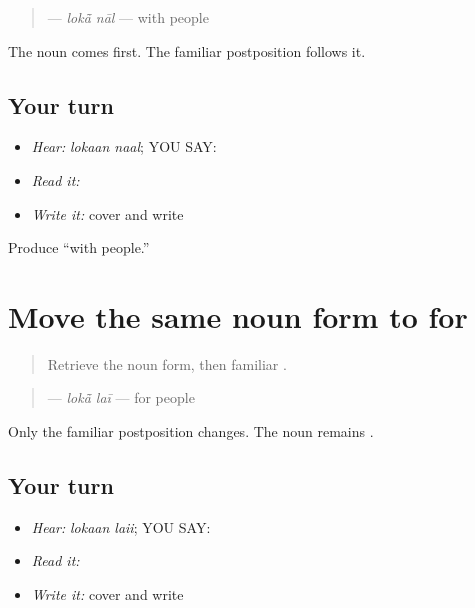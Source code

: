 \begin{grammarlens}[title={Grammar Lens: one familiar postposition}]
\begin{quote}
\textbf{ } — \emph{lokā̃ nāl} — with people
\end{quote}

The noun comes first. The familiar postposition follows it.
\end{grammarlens}

\subsection*{Your turn}
\begin{itemize}
\raggedright
  \item \emph{Hear:} \emph{lokaan naal}; YOU SAY: \textbf{ }
  \item \emph{Read it:} \textbf{ }
  \item \emph{Write it:} cover and write \textbf{ }
\end{itemize}

\begin{tcolorbox}[breakable,colback=teal!4,colframe=teal!35!black,title={Before you move on}]
Produce “with people.”
\end{tcolorbox}
\section[\texorpdfstring{\pa{ਲੋਕਾਂ} \pa{ਲਈ} (lokaan laii)}{ਲੋਕਾਂ ਲਈ (lokaan laii)}]{Move the same noun form to for}

\label{lesson:PA-C192-lokaan-lai}



\begin{quote}
Retrieve the noun form, then familiar \textbf{}.
\end{quote}

\begin{grammarlens}[title={Grammar Lens: keep the noun form}]
\begin{quote}
\textbf{ } — \emph{lokā̃ laī} — for people
\end{quote}

Only the familiar postposition changes. The noun remains \textbf{}.
\end{grammarlens}

\subsection*{Your turn}
\begin{itemize}
\raggedright
  \item \emph{Hear:} \emph{lokaan laii}; YOU SAY: \textbf{ }
  \item \emph{Read it:} \textbf{ }
  \item \emph{Write it:} cover and write \textbf{ }
\end{itemize}

